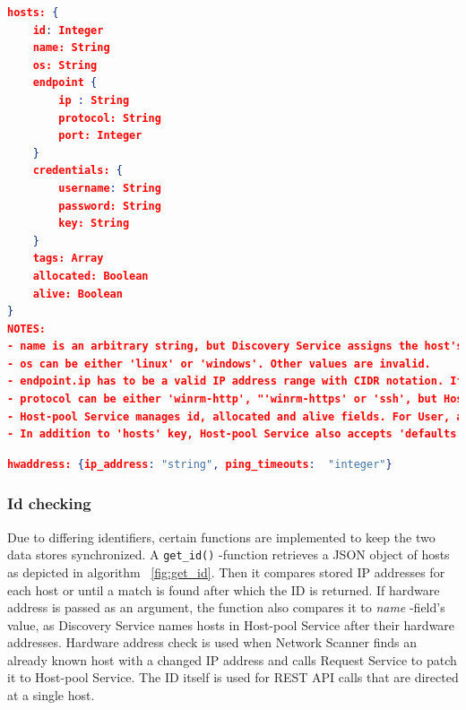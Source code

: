 \begin{lstlisting}[language=json,firstnumber=1, caption={JSON schema accepted by the Host-pool Service for a single host}, captionpos=b, label=lst:JSONformat]
hosts: {
	id: Integer
	name: String
	os: String
	endpoint {
		ip : String
		protocol: String
		port: Integer	
	}
	credentials: {
		username: String
		password: String
		key: String
	}
	tags: Array
	allocated: Boolean
	alive: Boolean
}
NOTES:
- name is an arbitrary string, but Discovery Service assigns the host's hardware address as the value of name.
- os can be either 'linux' or 'windows'. Other values are invalid.
- endpoint.ip has to be a valid IP address range with CIDR notation. If a range is defined, Host-pool Service considers each unique IP address a single host.
- protocol can be either 'winrm-http', "'winrm-https' or 'ssh', but Host-pool service does not explicitly force this.
- Host-pool Service manages id, allocated and alive fields. For User, all other fields except credentials.password, credentials.key and tags are obligatory.
- In addition to 'hosts' key, Host-pool Service also accepts 'defaults' key. 'defaults' can contain the same keys as 'hosts'. If 'defaults' is provided, its values are appended to each host which has respective undefined values. id, allocated and alive cannot be provided as defaults.

\end{lstlisting}

\begin{lstlisting}[language=json,firstnumber=1, caption={Discovery Service data format for a single host}, captionpos=b, label=lst:discoformat]
hwaddress: {ip_address: "string", ping_timeouts:  "integer"}
\end{lstlisting}

\subsubsection{Id checking}

Due to differing identifiers, certain functions are implemented to keep the two data stores synchronized. A \verb|get_id()| -function retrieves a JSON object of hosts as depicted in algorithm ~\ref{fig:get_id}. Then it compares stored IP addresses for each host or until a match is found after which the ID is returned. If hardware address is passed as an argument, the function also compares it to \emph{name} -field's value, as Discovery Service names hosts in Host-pool Service after their hardware addresses. Hardware address check is used when Network Scanner finds an already known host with a changed IP address and calls Request Service to patch it to Host-pool Service. The ID itself is used for REST API calls that are directed at a single host.

